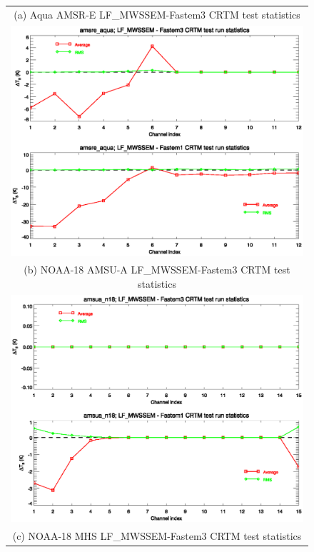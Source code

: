 \begin{figure}[htp]
  \centering
  \begin{tabular}{c}
    \textsf{(a) Aqua AMSR-E LF\_MWSSEM-Fastem3 CRTM test statistics}\\
    \includegraphics[bb=85 401 540 556,clip,scale=0.8]{graphics/Comparison/amsre_aqua.TBstats.eps}\\
    \textsf{(b) NOAA-18 AMSU-A LF\_MWSSEM-Fastem3 CRTM test statistics}\\
    \includegraphics[bb=85 401 540 556,clip,scale=0.8]{graphics/Comparison/amsua_n18.TBstats.eps}\\
    \textsf{(c) NOAA-18 MHS LF\_MWSSEM-Fastem3 CRTM test statistics}\\

\end{tabular}
\end{figure}
